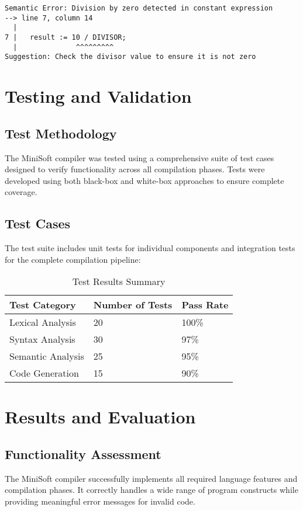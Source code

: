 \documentclass[12pt,a4paper]{article}
\begin{document}
\begin{lstlisting}[caption={Compile-Time Error Example}]
Semantic Error: Division by zero detected in constant expression
--> line 7, column 14
  |
7 |   result := 10 / DIVISOR;
  |              ^^^^^^^^^
Suggestion: Check the divisor value to ensure it is not zero
\end{lstlisting}

\section{Testing and Validation}
\subsection{Test Methodology}
The MiniSoft compiler was tested using a comprehensive suite of test cases designed to verify functionality across all compilation phases. Tests were developed using both black-box and white-box approaches to ensure complete coverage.

\subsection{Test Cases}
The test suite includes unit tests for individual components and integration tests for the complete compilation pipeline:

\begin{table}[H]
	\centering
	\begin{tabularx}{\textwidth}{|X|X|X|}
		\hline
		\textbf{Test Category} & \textbf{Number of Tests} & \textbf{Pass Rate} \\
		\hline
		Lexical Analysis       & 20                       & 100\%              \\
		\hline
		Syntax Analysis        & 30                       & 97\%               \\
		\hline
		Semantic Analysis      & 25                       & 95\%               \\
		\hline
		Code Generation        & 15                       & 90\%               \\
		\hline
	\end{tabularx}
	\caption{Test Results Summary}
	\label{tab:test-results}
\end{table}

\section{Results and Evaluation}
\subsection{Functionality Assessment}
The MiniSoft compiler successfully implements all required language features and compilation phases. It correctly handles a wide range of program constructs while providing meaningful error messages for invalid code.
\end{document}

